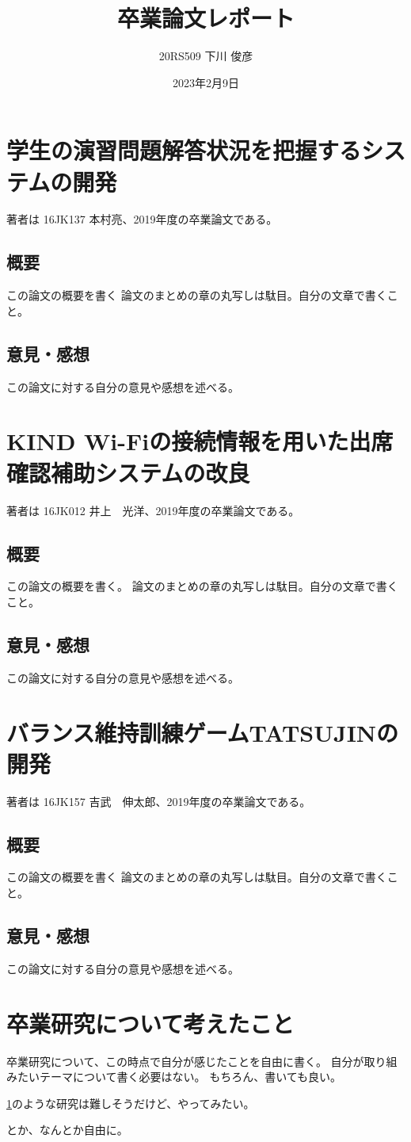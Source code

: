 \documentclass[uplatex,a4paper,12pt]{jsarticle}
\title{卒業論文レポート}
\author{20RS509 下川 俊彦}
\date{2023年2月9日}
\begin{document}
\maketitle

\section{学生の演習問題解答状況を把握するシステムの開発}\label{motomura}
著者は 16JK137 本村亮、2019年度の卒業論文である。

\subsection{概要}
この論文の概要を書く
論文のまとめの章の丸写しは駄目。自分の文章で書くこと。


\subsection{意見・感想}

この論文に対する自分の意見や感想を述べる。

\section{KIND Wi-Fiの接続情報を用いた出席確認補助システムの改良}\label{inoue}
著者は 16JK012 井上　光洋、2019年度の卒業論文である。

\subsection{概要}
この論文の概要を書く。
論文のまとめの章の丸写しは駄目。自分の文章で書くこと。
    

\subsection{意見・感想}

この論文に対する自分の意見や感想を述べる。


\section{バランス維持訓練ゲームTATSUJINの開発}\label{tatsujin}
著者は 16JK157 吉武　伸太郎、2019年度の卒業論文である。


\subsection{概要}
この論文の概要を書く
論文のまとめの章の丸写しは駄目。自分の文章で書くこと。
    

\subsection{意見・感想}

この論文に対する自分の意見や感想を述べる。

\section{卒業研究について考えたこと}

卒業研究について、この時点で自分が感じたことを自由に書く。
自分が取り組みたいテーマについて書く必要はない。
もちろん、書いても良い。

\ref{motomura}のような研究は難しそうだけど、やってみたい。

とか、なんとか自由に。
\end{document}
